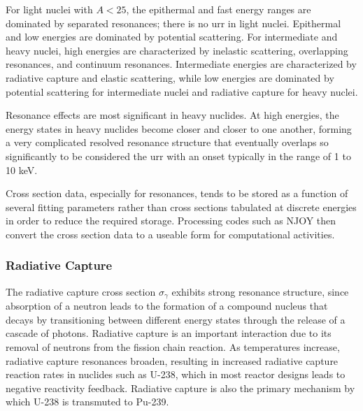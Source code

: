 For light nuclei with \(A<25\), the epithermal and fast energy ranges are dominated by separated resonances; there is no \gls{urr} in light nuclei. Epithermal and low energies are dominated by potential scattering. For intermediate and heavy nuclei, high energies are characterized by inelastic scattering, overlapping resonances, and continuum resonances. Intermediate energies are characterized by radiative capture and elastic scattering, while low energies are dominated by potential scattering for intermediate nuclei and radiative capture for heavy nuclei.

Resonance effects are most significant in heavy nuclides. At high energies, the energy states in heavy nuclides become closer and closer to one another, forming a very complicated resolved resonance structure that eventually overlaps so significantly to be considered the \gls{urr} with an onset typically in the range of 1 to 10 keV.


Cross section data, especially for resonances, tends to be stored as a function of several fitting parameters rather than cross sections tabulated at discrete energies in order to reduce the required storage. Processing codes such as NJOY then convert the cross section data to a useable form for computational activities. 

\subsubsection{Radiative Capture}

The radiative capture cross section \(\sigma_\gamma\) exhibits strong resonance structure, since absorption of a neutron leads to the formation of a compound nucleus that decays by transitioning between different energy states through the release of a cascade of photons. Radiative capture is an important interaction due to its removal of neutrons from the fission chain reaction. As temperatures increase, radiative capture resonances broaden, resulting in increased radiative capture reaction rates in nuclides such as U-238, which in most reactor designs leads to negative reactivity feedback. Radiative capture is also the primary mechanism by which U-238 is transmuted to Pu-239.

